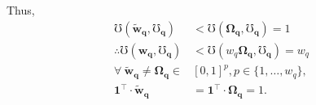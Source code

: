 \documentclass[hidelinks, nonatbib]{elsarticle}
\begin{document}
Thus, 
\begin{align}
    \mho(
        \boldsymbol{\tilde{w}_{q}},
        \boldsymbol{\mho_q}
    ) 
    &< 
    \mho(
        \boldsymbol{\Omega_{q}},
        \boldsymbol{\mho_q}
    ) 
    = 1
    \\
    \therefore
    \mho(
        \boldsymbol{w_{q}},
        \boldsymbol{\mho_q}
    )
    &< 
    \mho(
        w_{q}
        \boldsymbol{\Omega_{q}},
        \boldsymbol{\mho_q}
    ) 
    = w_q
    \\
    \forall
    \
    \boldsymbol{\tilde{w}_{q}}
    \neq
    \boldsymbol{\Omega_{q}}
    \in
    &
    [0,1]^{p}
    ,
    p \in \{1, \dots, w_q\}
    ,
    \\
    \boldsymbol{1} ^ {\top}
    \cdot
    \boldsymbol{\tilde{w}_{q}}
    &=
    \boldsymbol{1} ^ {\top}
    \cdot
    \boldsymbol{\Omega_{q}}
    = 1
    .
\end{align}

    
\end{document}
